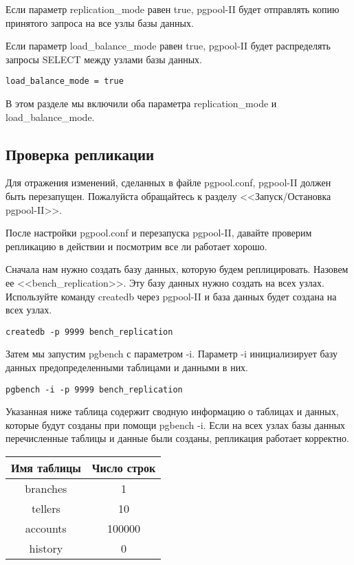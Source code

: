 Если параметр replication\_mode равен true, pgpool-II будет отправлять копию принятого запроса на все узлы базы данных.

Если параметр load\_balance\_mode равен true, pgpool-II будет распределять запросы SELECT между узлами базы данных.
\begin{lstlisting}[label=lst:pgpool18,caption=Настройка репликации]
load_balance_mode = true
\end{lstlisting}

В этом разделе мы включили оба параметра replication\_mode и load\_balance\_mode.

\subsection{Проверка репликации}
Для отражения изменений, сделанных в файле pgpool.conf, pgpool-II должен быть перезапущен.
Пожалуйста обращайтесь к разделу <<Запуск/Остановка pgpool-II>>.

После настройки pgpool.conf и перезапуска pgpool-II, давайте проверим репликацию в действии
и посмотрим все ли работает хорошо.

Сначала нам нужно создать базу данных, которую будем реплицировать. Назовем ее <<bench\_replication>>.
Эту базу данных нужно создать на всех узлах. Используйте команду createdb через pgpool-II и база
данных будет создана на всех узлах.
\begin{lstlisting}[label=lst:pgpool19,caption=Проверка репликации]
createdb -p 9999 bench_replication
\end{lstlisting}

Затем мы запустим pgbench с параметром -i. Параметр -i инициализирует базу данных предопределенными
таблицами и данными в них.
\begin{lstlisting}[label=lst:pgpool20,caption=Проверка репликации]
pgbench -i -p 9999 bench_replication
\end{lstlisting}

Указанная ниже таблица содержит сводную информацию о таблицах и данных, которые будут созданы при помощи pgbench -i.
Если на всех узлах базы данных перечисленные таблицы и данные были созданы, репликация работает корректно.

\begin{tabular}{ | c | c | }
  \hline
  Имя таблицы & Число строк \\
  \hline
  branches & 1 \\
  \hline
  tellers & 10 \\
  \hline
  accounts & 100000 \\
  \hline
  history & 0 \\
  \hline
\end{tabular}

